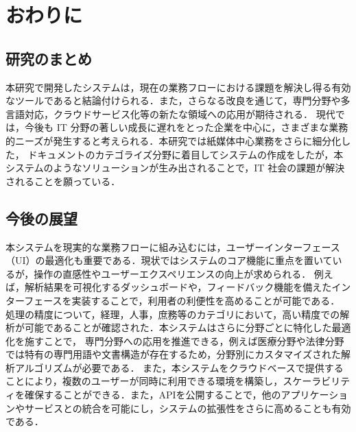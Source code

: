 \chapter{おわりに}
\label{ch:con}

\quad

\section{研究のまとめ}
\label{sec:con_fin}

本研究で開発したシステムは，現在の業務フローにおける課題を解決し得る有効なツールであると結論付けられる．また，さらなる改良を通じて，専門分野や多言語対応，クラウドサービス化等の新たな領域への応用が期待される．
現代では，今後も IT 分野の著しい成長に遅れをとった企業を中心に，さまざまな業務的ニーズが発生すると考えられる．本研究では紙媒体中心業務をさらに細分化した，
ドキュメントのカテゴライズ分野に着目してシステムの作成をしたが，本システムのようなソリューションが生み出されることで，IT 社会の課題が解決されることを願っている．

\section{今後の展望}
\label{sec:con_future}

本システムを現実的な業務フローに組み込むには，ユーザーインターフェース（UI）の最適化も重要である．現状ではシステムのコア機能に重点を置いているが，操作の直感性やユーザーエクスペリエンスの向上が求められる．
例えば，解析結果を可視化するダッシュボードや，フィードバック機能を備えたインターフェースを実装することで，利用者の利便性を高めることが可能である．
処理の精度について，経理，人事，庶務等のカテゴリにおいて，高い精度での解析が可能であることが確認された．本システムはさらに分野ごとに特化した最適化を施すことで，
専門分野への応用を推進できる，例えば医療分野や法律分野では特有の専門用語や文書構造が存在するため，分野別にカスタマイズされた解析アルゴリズムが必要である．
また，本システムをクラウドベースで提供することにより，複数のユーザーが同時に利用できる環境を構築し，スケーラビリティを確保することができる．また，APIを公開することで，他のアプリケーションやサービスとの統合を可能にし，システムの拡張性をさらに高めることも有効である．
